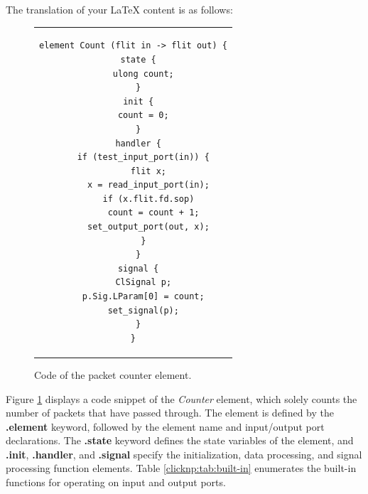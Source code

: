 The translation of your LaTeX content is as follows:

\begin{figure}[htbp]
\small
\centering
\begin{tabular}{c}
\begin{lstlisting}
element Count (flit in -> flit out) {
  state {
    ulong count;
  }
  init {
    count = 0;
  }
  handler {
    if (test_input_port(in)) {
      flit x;
      x = read_input_port(in);
      if (x.flit.fd.sop)
        count = count + 1;
      set_output_port(out, x);
    }
  }
  signal {
    ClSignal p;
    p.Sig.LParam[0] = count;
    set_signal(p);
  }
}
\end{lstlisting}
\end{tabular}
	\caption{Code of the packet counter element.}
	\label{clicknp:fig:count-element}
\end{figure}

Figure \ref{clicknp:fig:count-element} displays a code snippet of the \textit {Counter} element, which solely counts the number of packets that have passed through. The element is defined by the \textbf {.element} keyword, followed by the element name and input/output port declarations.
The \textbf {.state} keyword defines the state variables of the element, and \textbf {.init}, \textbf {.handler}, and \textbf {.signal} specify the initialization, data processing, and signal processing function elements.
Table \ref {clicknp:tab:built-in} enumerates the built-in functions for operating on input and output ports.

